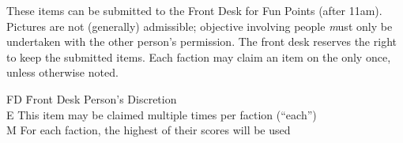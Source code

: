 These items can be submitted to the Front Desk for Fun Points (after 11am).
Pictures are not (generally) admissible; objective involving people {\textit
must only be undertaken with the other person's permission}.
The front desk reserves the right to keep the submitted items. Each faction may
claim an item on the only once, unless otherwise noted.
\begin{tabbing}
	FD \quad \= Front Desk Person's Discretion\footnotemark \\
	E \> This item may be claimed multiple times per faction (``each'') \\
	M \> For each faction, the highest of their scores will be used
\end{tabbing}


